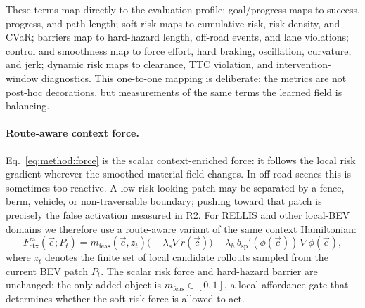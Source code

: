 These terms map directly to the evaluation profile: goal/progress maps
to success, progress, and path length; soft risk maps to cumulative risk,
risk density, and CVaR; barriers map to hard-hazard length, off-road
events, and lane violations; control and smoothness map to force effort,
hard braking, oscillation, curvature, and jerk; dynamic risk maps to
clearance, TTC violation, and intervention-window diagnostics. This
one-to-one mapping is deliberate: the metrics are not post-hoc
decorations, but measurements of the same terms the learned field is
balancing.

\paragraph{Route-aware context force.}
Eq.~\eqref{eq:method:force} is the scalar context-enriched force: it follows the
local risk gradient wherever the smoothed material field changes. In
off-road scenes this is sometimes too reactive. A low-risk-looking patch may
be separated by a fence, berm, vehicle, or non-traversable boundary; pushing
toward that patch is precisely the false activation measured in R2. For
RELLIS and other local-BEV domains we therefore use a route-aware variant of
the same context Hamiltonian:
\begin{equation}
F_{\mathrm{ctx}}^{\mathrm{ra}}(\vec c;P_t)
=
m_{\mathrm{feas}}(\vec c,z_t)
\bigl(-\lambda_s \nabla \tilde r(\vec c)\bigr)
-\lambda_h\, b_{\mathrm{sp}}'(\phi(\vec c))\,\nabla\phi(\vec c),
\label{eq:method:route_aware_force}
\end{equation}
where $z_t$ denotes the finite set of local candidate rollouts sampled from
the current BEV patch $P_t$. The scalar risk force and hard-hazard barrier
are unchanged; the only added object is
$m_{\mathrm{feas}}\in[0,1]$, a local affordance gate that determines whether
the soft-risk force is allowed to act.

